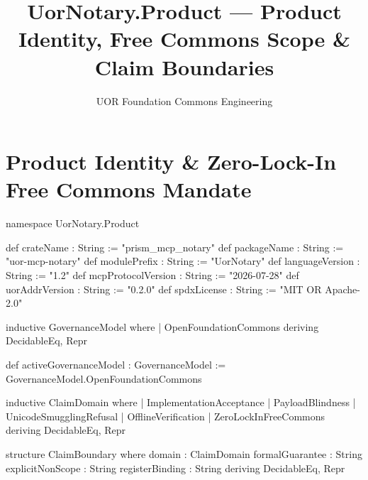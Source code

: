 \documentclass[12pt]{lexlean}
\title{UorNotary.Product --- Product Identity, Free Commons Scope \& Claim Boundaries}
\author{UOR Foundation Commons Engineering}
\begin{document}
\maketitle

\section{Product Identity \& Zero-Lock-In Free Commons Mandate}

\begin{lean}
namespace UorNotary.Product

def crateName : String := "prism_mcp_notary"
def packageName : String := "uor-mcp-notary"
def modulePrefix : String := "UorNotary"
def languageVersion : String := "1.2"
def mcpProtocolVersion : String := "2026-07-28"
def uorAddrVersion : String := "0.2.0"
def spdxLicense : String := "MIT OR Apache-2.0"

inductive GovernanceModel where
  | OpenFoundationCommons
deriving DecidableEq, Repr

def activeGovernanceModel : GovernanceModel :=
  GovernanceModel.OpenFoundationCommons

inductive ClaimDomain where
  | ImplementationAcceptance
  | PayloadBlindness
  | UnicodeSmugglingRefusal
  | OfflineVerification
  | ZeroLockInFreeCommons
deriving DecidableEq, Repr

structure ClaimBoundary where
  domain          : ClaimDomain
  formalGuarantee : String
  explicitNonScope : String
  registerBinding : String
deriving DecidableEq, Repr


\end{lean}
\end{document}
